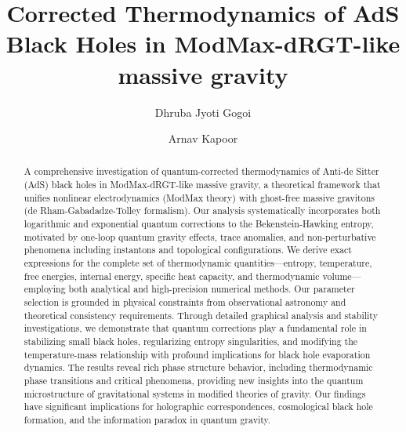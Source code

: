 \documentclass[superscriptaddress, prd, aps,amsmath,amssymb,showpacs,showkeys, onecolumn]{revtex4-2}
\begin{document}
\title{Corrected Thermodynamics of AdS Black Holes in ModMax-dRGT-like massive gravity}


\author{Dhruba Jyoti Gogoi }%

 \author{Arnav Kapoor}
%


\begin{abstract}
A comprehensive investigation of quantum-corrected thermodynamics of Anti-de Sitter (AdS) black holes in ModMax-dRGT-like massive gravity, a theoretical framework that unifies nonlinear electrodynamics (ModMax theory) with ghost-free massive gravitons (de Rham-Gabadadze-Tolley formalism). Our analysis systematically incorporates both logarithmic and exponential quantum corrections to the Bekenstein-Hawking entropy, motivated by one-loop quantum gravity effects, trace anomalies, and non-perturbative phenomena including instantons and topological configurations. We derive exact expressions for the complete set of thermodynamic quantities—entropy, temperature, free energies, internal energy, specific heat capacity, and thermodynamic volume—employing both analytical and high-precision numerical methods. Our parameter selection is grounded in physical constraints from observational astronomy and theoretical consistency requirements. Through detailed graphical analysis and stability investigations, we demonstrate that quantum corrections play a fundamental role in stabilizing small black holes, regularizing entropy singularities, and modifying the temperature-mass relationship with profound implications for black hole evaporation dynamics. The results reveal rich phase structure behavior, including thermodynamic phase transitions and critical phenomena, providing new insights into the quantum microstructure of gravitational systems in modified theories of gravity. Our findings have significant implications for holographic correspondences, cosmological black hole formation, and the information paradox in quantum gravity.
\end{abstract}
\end{document}
